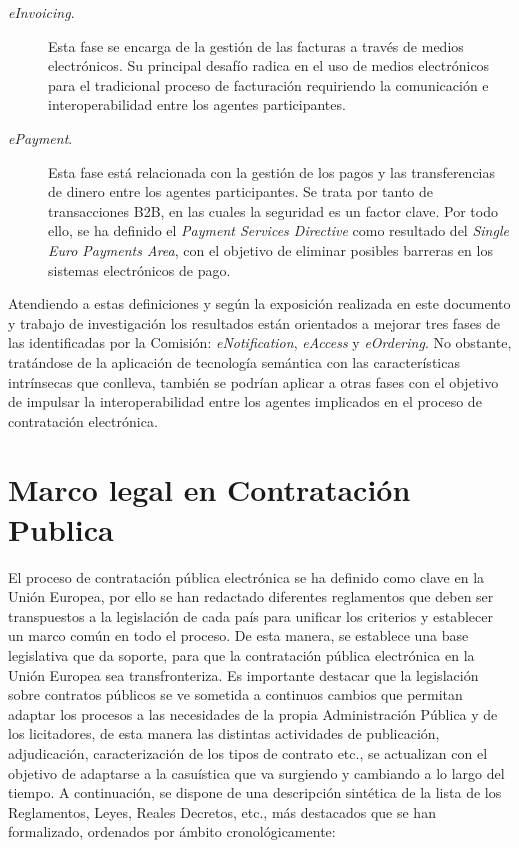 \begin{description}
\item [\textit{eInvoicing}.] Esta fase se encarga de la gestión de las facturas a través de medios
electrónicos. Su principal desafío radica en el uso de medios electrónicos para el tradicional 
proceso de facturación requiriendo la comunicación e interoperabilidad entre los agentes
participantes.

\item [\textit{ePayment}.] Esta fase está relacionada con la gestión de los pagos y las transferencias
de dinero entre los agentes participantes. Se trata por tanto de transacciones B2B, en las cuales
la seguridad es un factor clave. Por todo ello, se ha definido el \textit{Payment Services Directive}
como resultado del \textit{Single Euro Payments Area}, con el objetivo de eliminar posibles barreras
en los sistemas electrónicos de pago.
\end{description}

Atendiendo a estas definiciones y según la exposición realizada en este documento y trabajo de investigación
los resultados están orientados a mejorar tres fases de las identificadas por la Comisión: 
\textit{eNotification}, \textit{eAccess} y \textit{eOrdering}. No obstante, tratándose de la aplicación
de tecnología semántica con las características intrínsecas que conlleva, también se podrían aplicar
a otras fases con el objetivo de impulsar la interoperabilidad entre los agentes implicados en el proceso
de contratación electrónica.

\section{Marco legal en Contratación Publica}
El proceso de contratación pública electrónica se ha definido como clave en la Unión Europea, por ello
se han redactado diferentes reglamentos que deben ser transpuestos a la legislación de cada país para unificar
los criterios y establecer un marco común en todo el proceso. De esta manera, se establece una
base legislativa que da soporte, para que la contratación pública electrónica en la Unión Europea sea transfronteriza. Es importante
destacar que la legislación sobre contratos públicos se ve sometida a continuos cambios que permitan adaptar los procesos a las
necesidades de la propia Administración Pública y de los licitadores, de esta manera las distintas actividades de publicación,
adjudicación, caracterización de los tipos de contrato etc., se actualizan con el objetivo de adaptarse a la casuística que
va surgiendo y cambiando a lo largo del tiempo. A continuación, se dispone de una descripción sintética de 
la lista de los Reglamentos, Leyes, Reales Decretos, etc., más destacados que se han formalizado, 
ordenados por ámbito cronológicamente:

